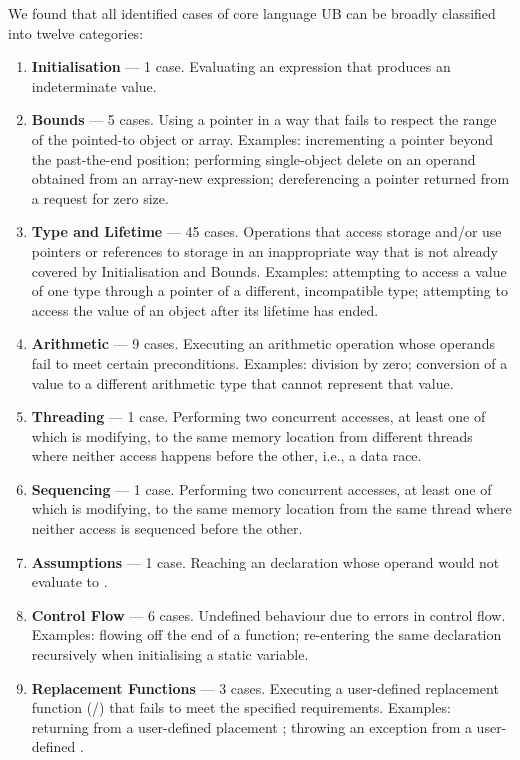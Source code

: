 We found that all identified cases of core language UB can be broadly classified into twelve categories:
 \renewcommand{\labelenumi}{\Roman{enumi}.}
\begin{enumerate}
\item \textbf{Initialisation} --- 1 case. Evaluating an expression that produces an indeterminate value. 
\item \textbf{Bounds} --- 5 cases. Using a pointer in a way that fails to respect the range of the pointed-to object or array. Examples: incrementing a pointer beyond the past-the-end position; performing single-object delete on an operand obtained from an array-new expression;  dereferencing a pointer returned from a request for zero size.
\item \textbf{Type and Lifetime} --- 45 cases. Operations that access storage and/or use pointers or references to storage in an inappropriate way that is not already covered by Initialisation and Bounds. Examples: attempting to access a value of one type through  a pointer of a different, incompatible type; attempting to access the value of an object after its lifetime has ended. 
\item \textbf{Arithmetic} --- 9 cases. Executing an arithmetic operation whose operands fail to meet certain preconditions. Examples: division by zero; conversion of a value to a different arithmetic type that cannot represent that value. 
\item \textbf{Threading} --- 1 case. Performing two concurrent accesses, at least one of which is modifying, to the same memory location from different threads where neither access happens before the other, i.e., a data race. 
\item \textbf{Sequencing} --- 1 case. Performing two concurrent accesses, at least one of which is modifying, to the same memory location from the same thread where neither access is sequenced before the other.
\item \textbf{Assumptions} --- 1 case. Reaching an \tcode{[[assume]]} declaration whose operand would not evaluate to .
\item \textbf{Control Flow} --- 6 cases. Undefined behaviour due to errors in control flow.
Examples: flowing off the end of a function; re-entering the same declaration recursively when initialising a static variable.
\item \textbf{Replacement Functions} --- 3 cases. Executing a user-defined replacement function (/) that fails to meet the specified requirements. Examples: returning  from a user-defined placement ; throwing an exception from a user-defined .

\end{enumerate}
